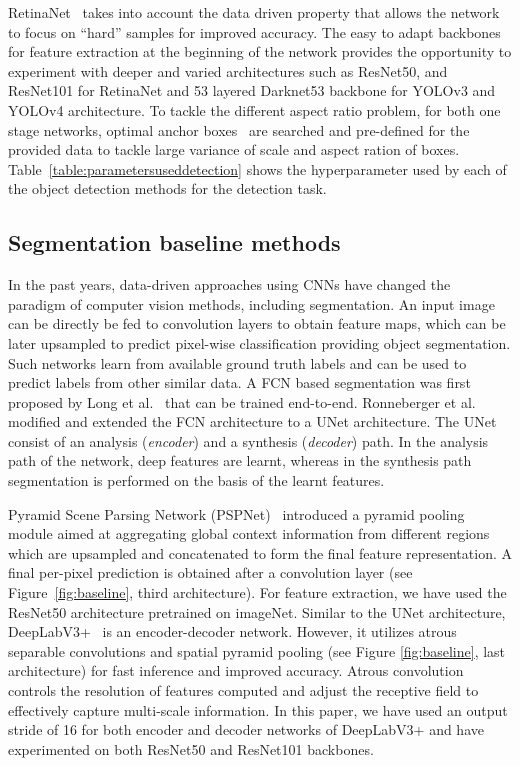 \documentclass[journal]{IEEEtran}
\begin{document}
RetinaNet~\cite{lin2017focal} takes into account the data driven property that allows the network to focus on ``hard'' samples for improved accuracy. The easy to adapt backbones for feature extraction at the beginning of the network provides the opportunity to experiment with deeper and varied architectures such as ResNet50, and ResNet101 for RetinaNet and 53 layered Darknet53 backbone for YOLOv3 and YOLOv4 architecture. To tackle the different aspect ratio problem, for both one stage networks, optimal anchor boxes~\cite{ren2015faster} are searched and pre-defined for the provided data to tackle large variance of scale and aspect ration of boxes.  Table~\ref{table:parametersuseddetection} shows the hyperparameter used by each of the object detection methods for the detection task. 

\subsection{Segmentation baseline methods}
In the past years, data-driven approaches using \acp{CNN} have changed the paradigm of computer vision methods, including segmentation. An input image can be directly be fed to convolution layers to obtain feature maps, which can be later upsampled to predict pixel-wise classification providing object segmentation. Such networks learn from available ground truth labels and can be used to predict labels from other similar data. A \ac{FCN} based segmentation was first proposed by  Long et al.~\cite{long2015fully} that can be trained end-to-end. Ronneberger et al.~\cite{ronneberger2015u} modified and extended the FCN architecture to a UNet architecture. The UNet consist of an analysis (\textit{encoder}) and a synthesis (\textit{decoder}) path. In the analysis path of the network, deep features are learnt, whereas in the synthesis path segmentation is performed on the basis of the learnt features.

Pyramid Scene Parsing Network (PSPNet)~\cite{zhao2017pyramid} introduced a pyramid pooling module aimed at aggregating global context information from different regions which are upsampled and concatenated to form the final feature representation. A final per-pixel prediction is obtained after a convolution layer (see Figure~\ref{fig:baseline}, third architecture). For feature extraction, we have used the ResNet50 architecture pretrained on imageNet. Similar to the UNet architecture, DeepLabV3+~\cite{chen2018encoder} is an encoder-decoder network. However, it utilizes atrous separable convolutions and spatial pyramid pooling (see Figure \ref{fig:baseline}, last architecture) for fast inference and improved accuracy. Atrous convolution controls the resolution of features computed and adjust the receptive field to effectively capture multi-scale information. In this paper, we have used an output stride of 16 for both encoder and decoder networks of DeepLabV3+ and have experimented on both ResNet50 and ResNet101 backbones. 
\end{document}
